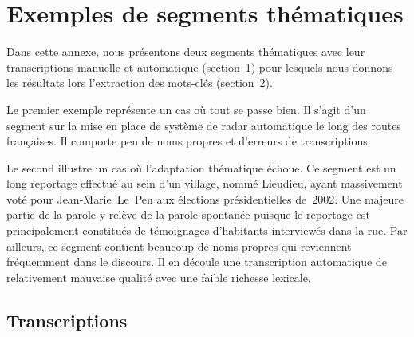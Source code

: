 \chapter{Exemples de segments thématiques}
\label{app:seg_them}

Dans cette annexe, nous présentons deux segments thématiques avec leur
transcriptions manuelle et automatique (section~1) pour
lesquels nous donnons les résultats lors l'extraction des mots-clés (section~2).

Le premier exemple représente un cas où tout se passe bien.
Il s'agit d'un segment sur la mise en place de système de radar automatique le
long des routes françaises. Il comporte peu de noms propres et d'erreurs de
transcriptions.

Le second illustre un cas où
l'adaptation thématique échoue. Ce segment est un long reportage effectué au
sein d'un village, nommé Lieudieu, ayant massivement voté pour Jean-Marie~Le~Pen
aux élections présidentielles de~2002. Une majeure partie de la parole
y relève de la parole spontanée puisque le reportage est principalement
constitués de témoignages d'habitants interviewés dans la rue. Par ailleurs,
ce segment contient beaucoup de noms propres qui reviennent fréquemment dans le
discours. Il en découle une transcription automatique de relativement mauvaise
qualité avec une faible richesse lexicale.

\newpage

\section{Transcriptions}
\label{sec:app_trans}

